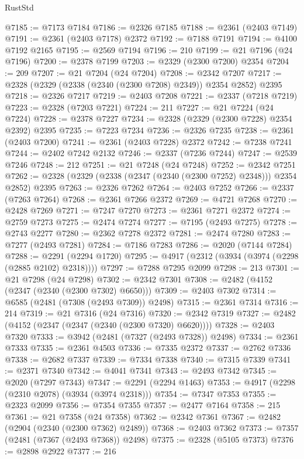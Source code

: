 \begin{lexlean}{RustStd}
\begin{coremodule}
{\begin{coremodule}
{{{{{{{{{{{{{{{{{{{{{{{{{{{{{{{{{{{{{@7185 := @7173 @7184
@7186 := @2326 @7185
@7188 := @2361 (@2403 @7149)
@7191 := @2361 (@2403 @7178) @2372
@7192 := @7188 @7191
@7194 := @4100 @7192 @2165
@7195 := @2569 @7194
@7196 := 210
@7199 := @21 @7196 (@24 @7196)
@7200 := @2378 @7199
@7203 := @2329 (@2300 @7200) @2354
@7204 := 209
@7207 := @21 @7204 (@24 @7204)
@7208 := @2342 @7207
@7217 := @2328 (@2329 (@2338 (@2340 (@2300 @7208) @2349)) @2354 @2852) @2395
@7218 := @2326 @7217
@7219 := @2403 @7208
@7221 := @2337 (@7218 @7219)
@7223 := @2328 (@7203 @7221)
@7224 := 211
@7227 := @21 @7224 (@24 @7224)
@7228 := @2378 @7227
@7234 := @2328 (@2329 (@2300 @7228) @2354 @2392) @2395
@7235 := @7223 @7234
@7236 := @2326 @7235
@7238 := @2361 (@2403 @7200)
@7241 := @2361 (@2403 @7228) @2372
@7242 := @7238 @7241
@7244 := @2402 @7242 @2132
@7246 := @2337 (@7236 @7244)
@7247 := @2539 @7246
@7248 := 212
@7251 := @21 @7248 (@24 @7248)
@7252 := @2342 @7251
@7262 := @2328 (@2329 (@2338 (@2347 (@2340 (@2300 @7252) @2348))) @2354 @2852) @2395
@7263 := @2326 @7262
@7264 := @2403 @7252
@7266 := @2337 (@7263 @7264)
@7268 := @2361 @7266 @2372
@7269 := @4721 @7268
@7270 := @2428 @7269
@7271 := @7247 @7270
@7273 := @2361 @7271 @2372
@7274 := @2759 @7273
@7275 := @2474 @7274
@7277 := @7195 (@2493 @7275)
@7278 := @2743 @2277
@7280 := @2362 @7278 @2372
@7281 := @2474 @7280
@7283 := @7277 (@2493 @7281)
@7284 := @7186 @7283
@7286 := @2020 (@7144 @7284)
@7288 := @2291 (@2294 @1720)
@7295 := @4917 (@2312 (@3934 (@3974 (@2298 (@2885 @2102) @2318))))
@7297 := @7288 @7295 @2099
@7298 := 213
@7301 := @21 @7298 (@24 @7298)
@7302 := @2342 @7301
@7308 := @2482 (@4152 (@2347 (@2340 (@2300 @7302) @6650)))
@7309 := @2403 @7302
@7314 := @6585 (@2481 (@7308 (@2493 @7309)) @2498)
@7315 := @2361 @7314
@7316 := 214
@7319 := @21 @7316 (@24 @7316)
@7320 := @2342 @7319
@7327 := @2482 (@4152 (@2347 (@2347 (@2340 (@2300 @7320) @6620))))
@7328 := @2403 @7320
@7333 := @3942 (@2481 (@7327 (@2493 @7328)) @2498)
@7334 := @2361 @7333
@7335 := @2361 @4503
@7336 := @7335 @2372
@7337 := @2762 @7336
@7338 := @2682 @7337
@7339 := @7334 @7338
@7340 := @7315 @7339
@7341 := @2371 @7340
@7342 := @4041 @7341
@7343 := @2493 @7342
@7345 := @2020 (@7297 @7343)
@7347 := @2291 (@2294 @1463)
@7353 := @4917 (@2298 (@2310 @2078) (@3934 (@3974 @2318)))
@7354 := @7347 @7353
@7355 := @2323 @2099
@7356 := @7354 @7355
@7357 := @2477 @7164
@7358 := 215
@7361 := @21 @7358 (@24 @7358)
@7362 := @2342 @7361
@7367 := @2482 (@2904 (@2340 (@2300 @7362) @2489))
@7368 := @2403 @7362
@7373 := @7357 (@2481 (@7367 (@2493 @7368)) @2498)
@7375 := @2328 (@5105 @7373)
@7376 := @2898 @2922
@7377 := 216
}}}}}}}}}}}}}}}}}}}}}}}}}}}}}}}}}}}}}
\end{coremodule}}
\end{coremodule}
\end{lexlean}
